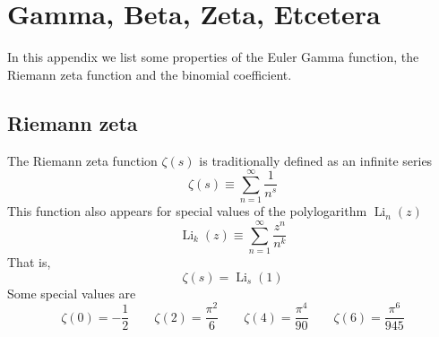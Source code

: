 \chapter{Gamma, Beta, Zeta, Etcetera\label{AppGamma}}
In this appendix we list some properties of the Euler Gamma function, the Riemann zeta function and the binomial coefficient.
\section{Riemann zeta}
The Riemann zeta function $\zeta(s)$ is traditionally defined as an infinite series
\begin{equation}
	\zeta(s) \equiv \sum_{n = 1}^{\infty} \frac{1}{n^{s}}
\end{equation}
This function also appears for special values of the polylogarithm $\operatorname{Li}_{n}{(z)}$
\begin{equation}
	\operatorname{Li}_{k}{(z)} \equiv \sum_{n = 1}^{\infty} \frac{z^{n}}{n^{k}}
\end{equation}
That is,
\begin{equation}
	\zeta(s) = \operatorname{Li}_{s}{(1)}
\end{equation}
Some special values are
\begin{equation}
	\zeta(0) = - \frac{1}{2} \qquad \zeta(2) = \frac{\pi^{2}}{6} \qquad \zeta(4) = \frac{\pi^{4}}{90} \qquad \zeta(6) = \frac{\pi^{6}}{945}
\end{equation}
